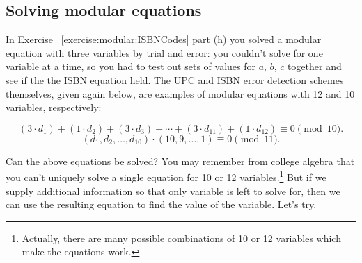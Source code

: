 


\subsection{Solving modular equations}

In Exercise ~\ref{exercise:modular:ISBNCodes} part (h) you solved a modular equation with three variables by trial and error: you couldn't solve for one variable at a time, so you had to test out sets of values for $a$, $b$, $c$ together and see if the the ISBN equation held.  The UPC and ISBN error detection schemes themselves, given again below,  are examples of modular equations with 12 and 10 variables, respectively: 

\[
(3 \cdot d_1) + (1 \cdot d_2) + (3 \cdot d_3) + \cdots + (3 \cdot
d_{11}) + (1 \cdot d_{12}) \equiv 0 \pmod{10}.
\]
\[
(d_1, d_2, \ldots, d_{10} ) \cdot (10, 9, \ldots, 1 )  \equiv 0 \pmod{11}.
\] 

Can the above equations be solved?  You may remember from college algebra that you can't uniquely solve a single equation for 10 or 12 variables.\footnote{Actually, there are many possible combinations of 10 or 12 variables which make the equations work.}  But if we supply additional information so that only variable is left to solve for, then we can use the resulting equation to find the value of the variable.  Let's try.  

